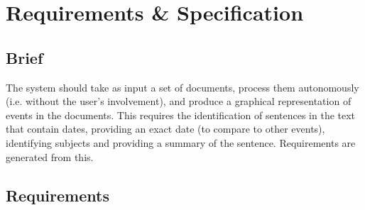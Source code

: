 \chapter{Requirements \& Specification}
\section{Brief}
\par The system should take as input a set of documents, process them autonomously (i.e. without the user's involvement), and produce a graphical representation of events in the documents. This requires the identification of sentences in the text that contain dates, providing an exact date (to compare to other events), identifying subjects and providing a summary of the sentence. Requirements are generated from this.

\section {Requirements}

